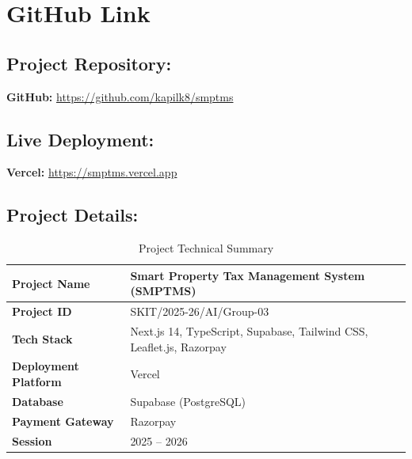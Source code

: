 \chapter*{GitHub Link}
\section*{Project Repository:}
\large{\textbf{GitHub:} \url{https://github.com/kapilk8/smptms}}

\section*{Live Deployment:}
\large{\textbf{Vercel:} \url{https://smptms.vercel.app}}

\section*{Project Details:}
\begin{table}[H]
\begin{center}
\begin{tabular}{| m{5cm} | m{9cm} |}
\hline
\textbf{Project Name} & Smart Property Tax Management System (SMPTMS) \\
\hline
\textbf{Project ID} & SKIT/2025-26/AI/Group-03 \\
\hline
\textbf{Tech Stack} & Next.js 14, TypeScript, Supabase, Tailwind CSS, Leaflet.js, Razorpay \\
\hline
\textbf{Deployment Platform} & Vercel \\
\hline
\textbf{Database} & Supabase (PostgreSQL) \\
\hline
\textbf{Payment Gateway} & Razorpay \\
\hline
\textbf{Session} & 2025 -- 2026 \\
\hline
\end{tabular}
\caption{Project Technical Summary}
\end{center}
\end{table}
